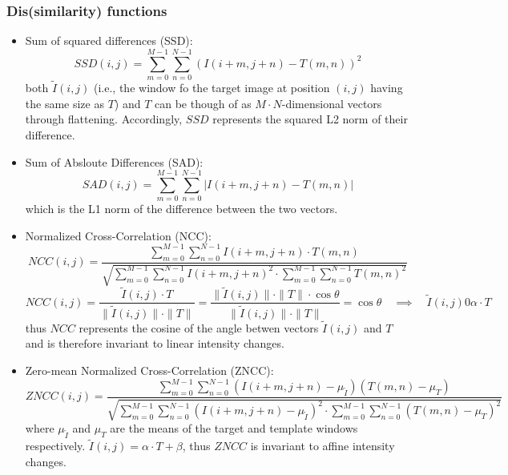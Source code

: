 \documentclass{article}
\begin{document}
\subsubsection{Dis(similarity) functions}
\begin{itemize}
    \item   Sum of squared differences (SSD):
        \[
            SSD(i,j) = \displaystyle\sum_{m=0}^{M-1}\displaystyle\sum_{n=0}^{N-1}(I(i+m,j+n)-T(m,n))^2
        \]
        both $\tilde{I}(i,j)$ (i.e., the window fo the target image at position $(i,j)$ having the same size as $T$) and $T$ can be though of as $M\cdot N$-dimensional vectors through flattening. Accordingly, $SSD$ represents the squared L2 norm of their difference.
    \item Sum of Absloute Differences (SAD):
        \[
            SAD(i,j) = \displaystyle\sum_{m=0}^{M-1}\displaystyle\sum_{n=0}^{N-1}|I(i+m,j+n)-T(m,n)|
        \]
        which is the L1 norm of the difference between the two vectors.
    \item Normalized Cross-Correlation (NCC):
        \[
            NCC(i,j) = \displaystyle\frac{\displaystyle\sum_{m=0}^{M-1}\displaystyle\sum_{n=0}^{N-1}I(i+m,j+n)\cdot T(m,n)}{\sqrt{\displaystyle\sum_{m=0}^{M-1}\displaystyle\sum_{n=0}^{N-1}I(i+m,j+n)^2 \cdot \displaystyle\sum_{m=0}^{M-1}\displaystyle\sum_{n=0}^{N-1}T(m,n)^2}}
        \]
        \[
            NCC(i,j) = \displaystyle\frac{\tilde{I}(i,j)\cdot T}{\|\tilde{I}(i,j)\|\cdot \|T\|} = \displaystyle\frac{\|\tilde{I}(i,j)\|\cdot \|T\|\cdot \cos\theta}{\|\tilde{I}(i,j)\|\cdot \|T\|} = \cos\theta \quad \implies \quad \tilde{I}(i,j) 0 \alpha \cdot T 
        \]
        thus $NCC$ represents the cosine of the angle betwen vectors $\tilde{I}(i,j)$ and $T$ and is therefore invariant to linear intensity changes.
        \item Zero-mean Normalized Cross-Correlation (ZNCC):
            \[
                ZNCC(i,j) = \displaystyle\frac{\displaystyle\sum_{m=0}^{M-1}\displaystyle\sum_{n=0}^{N-1}(I(i+m,j+n)-\mu_{\tilde{I}})(T(m,n)-\mu_T)}{\sqrt{\displaystyle\sum_{m=0}^{M-1}\displaystyle\sum_{n=0}^{N-1}(I(i+m,j+n)-\mu_{\tilde{I}})^2 \cdot \displaystyle\sum_{m=0}^{M-1}\displaystyle\sum_{n=0}^{N-1}(T(m,n)-\mu_T)^2}}
            \]
            where $\mu_{\tilde{I}}$ and $\mu_T$ are the means of the target and template windows respectively.
            $\tilde{I}(i,j) = \alpha\cdot T + \beta$, thus $ZNCC$ is invariant to affine intensity changes.
\end{itemize}
\end{document}
